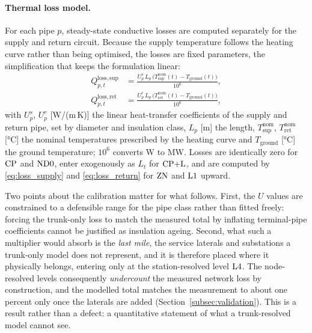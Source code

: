 \paragraph{Thermal loss model.}
For each pipe $p$, steady-state conductive losses are computed separately for the supply
and return circuit. Because the supply temperature follows the heating curve rather than
being optimised, the losses are fixed parameters, the simplification that keeps the
formulation linear:
%
\begin{align}
  Q_{p,t}^{\mathrm{loss,sup}} &= \frac{U^{s}_p\, L_p\,
    \bigl(T_{\mathrm{sup}}^{\mathrm{nom}}(t)
    - T_{\mathrm{ground}}(t)\bigr)}{10^6},
  \label{eq:loss_supply} \\[4pt]
  Q_{p,t}^{\mathrm{loss,ret}} &= \frac{U^{r}_p\, L_p\,
    \bigl(T_{\mathrm{ret}}^{\mathrm{nom}}(t)
    - T_{\mathrm{ground}}(t)\bigr)}{10^6},
  \label{eq:loss_return}
\end{align}
%
with $U^{s}_p$, $U^{r}_p$ [W/(m\,K)] the linear heat-transfer coefficients of the supply
and return pipe, set by diameter and insulation class, $L_p$ [m] the length,
$T_{\mathrm{sup}}^{\mathrm{nom}}$, $T_{\mathrm{ret}}^{\mathrm{nom}}$ [°C] the nominal
temperatures prescribed by the heating curve and $T_{\mathrm{ground}}$ [°C] the ground
temperature; $10^6$ converts W to MW. Losses are identically zero for $\mathrm{CP}$ and $\mathrm{ND0}$,
enter exogenously as $L_t$ for $\mathrm{CP{+}L}$, and are computed by \eqref{eq:loss_supply} and
\eqref{eq:loss_return} for $\mathrm{ZN}$ and $\mathrm{L1}$ upward.

Two points about the calibration matter for what follows. First, the $U$ values are
constrained to a defensible range for the pipe class rather than fitted freely: forcing the
trunk-only loss to match the measured total by inflating terminal-pipe coefficients cannot be
justified as insulation ageing. Second, what such a multiplier would absorb is the
\emph{last mile}, the service laterals and substations a trunk-only model does not represent,
and it is therefore placed where it physically belongs, entering only at the station-resolved
level $\mathrm{L4}$. The node-resolved levels consequently \emph{undercount} the measured network
loss by construction, and the modelled total matches the measurement to about one percent
only once the laterals are added (Section~\ref{subsec:validation}). This is a result rather
than a defect: a quantitative statement of what a trunk-resolved model cannot see.

